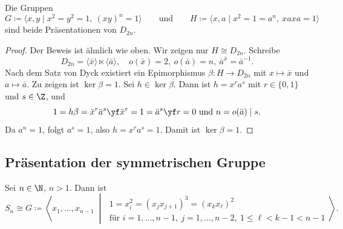 \documentclass[11pt]{article}
\begin{document}
\begin{proposition}\Theorem
  Die Gruppen
  \[ G \coloneqq \langle x, y \mid x^2 = y^2 = 1,\ (xy)^n = 1 \rangle \qquad \text{und} \qquad H \coloneqq \langle x, a \mid x^2 = 1 = a^n,\ xaxa = 1 \rangle \]
  sind beide Präsentationen von $D_{2n}$.
\end{proposition}


\begin{proof}
  Der Beweis ist ähnlich wie oben. Wir zeigen nur $H \cong D_{2n}$. Schreibe
  \[ D_{2n} = \langle \bar{x} \rangle \ltimes \langle \bar{a} \rangle, \quad o(\bar{x}) = 2,\ o(\bar{a}) = n,\ \bar{a}^{\bar{x}} = \bar{a}^{-1}. \]
  Nach dem Satz von Dyck existiert ein Epimorphismus $\beta\colon H \to D_{2n}$ mit $x \mapsto \bar{x}$ und $a \mapsto \bar{a}$. Zu zeigen ist $\ker\beta = 1$. Sei $h \in \ker\beta$. Dann ist $h = x^r a^s$ mit $r \in \{0, 1\}$ und $s \in \Z$, und
  \[ 1 = h\beta = \bar{x}^r \bar{a}^s \yf \bar{x}^r = 1 = \bar{a}^s \yf r = 0 \text{ und } n = o(\bar{a}) \mid s. \]
  Da $a^n = 1$, folgt $a^s = 1$, also $h = x^r a^s = 1$. Damit ist $\ker\beta = 1$.
\end{proof}

\subsection{Präsentation der symmetrischen Gruppe}

\begin{theorem}\Theorem
  Sei $n \in \N$, $n > 1$. Dann ist
  \[
    S_n \cong G \coloneqq \left\langle x_1, \dots, x_{n-1} \;\middle|\;
    \begin{array}{l}
      1 = x_i^2 = (x_j x_{j+1})^3 = (x_k x_\ell)^2 \\[2pt]
      \text{für } i = 1, \dots, n-1,\ j = 1, \dots, n-2,\ 1 \le \ell < k - 1 < n - 1
    \end{array}
    \right\rangle.
  \]
\end{theorem}
\end{document}
